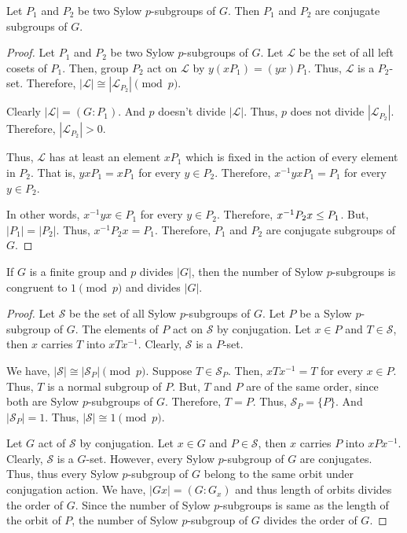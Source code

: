 \begin{theorem}
	Let $P_1$ and $P_2$ be two Sylow $p$-subgroups of $G$.
	Then $P_1$ and $P_2$ are conjugate subgroups of $G$.
\end{theorem}
\begin{proof}
	Let $P_1$ and $P_2$ be two Sylow $p$-subgroups of $G$.
	Let $\mathscr{L}$ be the set of all left cosets of $P_1$.
	Then, group $P_2$ act on $\mathscr{L}$ by $y(xP_1) = (yx)P_1$.
	Thus, $\mathscr{L}$ is a $P_2$-set.
	Therefore, $|\mathscr{L}| \cong |\mathscr{L}_{P_2}| \pmod{p}$.

	Clearly $|\mathscr{L}| = (G:P_1)$.
	And $p$ doesn't divide $|\mathscr{L}|$.
	Thus, $p$ does not divide $|\mathscr{L}_{P_2}|$.
	Therefore, $|\mathscr{L}_{P_2}| > 0$.

	Thus, $\mathscr{L}$ has at least an element $xP_1$ which is fixed in the action of every element in $P_2$.
	That is, $yxP_1 = xP_1$ for every $y \in P_2$.
	Therefore, $x^{-1}yxP_1 = P_1$ for every $y \in P_2$.

	In other words, $x^{-1}yx \in P_1$ for every $y \in P_2$.
	Therefore, $x^{-1}P_2x \le P_1$.
	But, $|P_1| = |P_2|$.
	Thus, $x^{-1}P_2x = P_1$.
	Therefore, $P_1$ and $P_2$ are conjugate subgroups of $G$.
\end{proof}


\begin{theorem}
	If $G$ is a finite group and $p$ divides $|G|$, then the number of Sylow $p$-subgroups is congruent to $1 \pmod{p}$ and divides $|G|$.
\end{theorem}
\begin{proof}
	Let $\mathscr{S}$ be the set of all Sylow $p$-subgroups of $G$.
	Let $P$ be a Sylow $p$-subgroup of $G$.
	The elements of $P$ act on $\mathscr{S}$ by conjugation.
	Let $x \in P$ and $T \in \mathscr{S}$, then $x$ carries $T$ into $xTx^{-1}$.
	Clearly, $\mathscr{S}$ is a $P$-set.

	We have, $|\mathscr{S}| \cong |\mathscr{S}_P| \pmod{p}$.
	Suppose $T \in \mathscr{S}_P$.
	Then, $xTx^{-1} = T$ for every $x \in P$.
	Thus, $T$ is a normal subgroup of $P$.
	But, $T$ and $P$ are of the same order, since both are Sylow $p$-subgroups of $G$.	
	Therefore, $T = P$.
	Thus, $\mathscr{S}_P = \{ P \}$.
	And $|\mathscr{S}_P| = 1$.
	Thus, $|\mathscr{S}| \cong 1 \pmod{p}$.

	Let $G$ act of $\mathscr{S}$ by conjugation.
	Let $x \in G$ and $P \in \mathscr{S}$, then $x$ carries $P$ into $xPx^{-1}$.
	Clearly, $\mathscr{S}$ is a $G$-set.
	However, every Sylow $p$-subgroup of $G$ are conjugates.
	Thus, thus every Sylow $p$-subgroup of $G$ belong to the same orbit under conjugation action.
	We have, $|Gx| = (G:G_x)$ and thus length of orbits divides the order of $G$.
	Since the number of Sylow $p$-subgroups is same as the length of the orbit of $P$, the number of Sylow $p$-subgroup of $G$ divides the order of $G$.
\end{proof}

